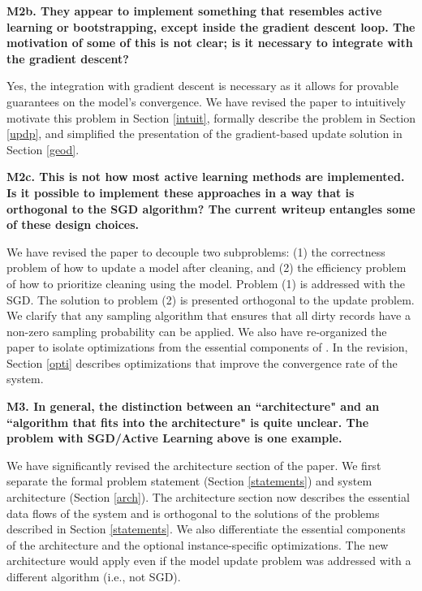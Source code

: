 \noindent \textbf{M2b. They appear to implement something that resembles active learning or bootstrapping, except inside the gradient descent loop. The motivation of some of this is not clear; is it necessary to integrate with the gradient descent?} 

Yes, the integration with gradient descent is necessary as it allows for provable guarantees on the model's convergence.
We have revised the paper to intuitively motivate this problem in Section \ref{intuit}, formally describe the problem in Section \ref{updp}, and simplified the presentation of the gradient-based update solution in Section \ref{geod}.

\vspace{0.5em}

\noindent\textbf{M2c. This is not how most active learning methods are implemented. Is it possible to implement these approaches in a way that is orthogonal to the SGD algorithm? The current writeup entangles some of these design choices.} 

We have revised the paper to decouple two subproblems: (1) the correctness problem of how to update a model after cleaning, and (2) the efficiency problem of how to prioritize cleaning using the model. 
Problem (1) is addressed with the SGD.
The solution to problem (2) is presented orthogonal to the update problem.
We clarify that any sampling algorithm that ensures that all dirty records have a non-zero sampling probability can be applied.
We also have re-organized the paper to isolate optimizations from the essential components of \sys.
In the revision, Section \ref{opti} describes optimizations that improve the convergence rate of the system.

\vspace{0.5em}

\noindent\textbf{M3. In general, the distinction between an ``architecture" and an ``algorithm that fits into the architecture" is quite unclear. The problem with SGD/Active Learning above is one example.}

We have significantly revised the architecture section of the paper.
We first separate the formal problem statement (Section \ref{statements}) and system architecture (Section \ref{arch}).
The architecture section now describes the essential data flows of the system and is orthogonal to the solutions of the problems described in Section \ref{statements}.
We also differentiate the essential components of the architecture and the optional instance-specific optimizations.
The new architecture would apply even if the model update problem was addressed with a different algorithm (i.e., not SGD).


